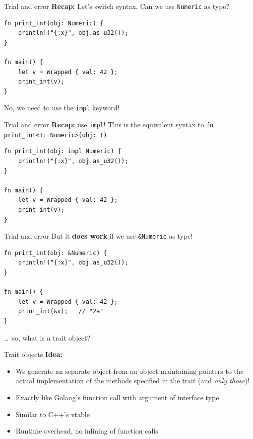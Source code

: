 \documentclass{beamer}
\begin{document}
\begin{frame}[fragile]{Trial and error}
  \textbf{Recap:} Let's switch syntax. Can we use \texttt{Numeric} as type?
  \begin{verbatim}
fn print_int(obj: Numeric) {
    println!("{:x}", obj.as_u32());
}

fn main() {
    let v = Wrapped { val: 42 };
    print_int(v);
}
\end{verbatim}
  \pause
  No, we need to use the \texttt{impl} keyword!
\end{frame}

\begin{frame}[fragile]{Trial and error}
  \textbf{Recap:} use \texttt{impl}! This is the equivalent syntax to \texttt{fn print_int<T: Numeric>(obj: T)}.
  \begin{verbatim}
fn print_int(obj: impl Numeric) {
    println!("{:x}", obj.as_u32());
}

fn main() {
    let v = Wrapped { val: 42 };
    print_int(v);
}
\end{verbatim}
\end{frame}

\begin{frame}[fragile]{Trial and error}
  But it \textbf{does work} if we use \texttt{&Numeric} as type!
  \begin{verbatim}
fn print_int(obj: &Numeric) {
    println!("{:x}", obj.as_u32());
}

fn main() {
    let v = Wrapped { val: 42 };
    print_int(&v);   // "2a"
}
\end{verbatim}
\end{frame}

\begin{frame}[standout]
  \dots\ so, what is a trait object?
\end{frame}

\begin{frame}[fragile]{Trait objects}
  \textbf{Idea:}
  \begin{itemize}
    \item We generate an separate object from an object maintaining pointers to the actual implementation of the methods specified in the trait (and \emph{only those})!
    \item Exactly like Golang's function call with argument of interface type
    \item Similar to C++'s vtable
    \item Runtime overhead, no inlining of function calls
  \end{itemize}
\end{frame}
\end{document}
